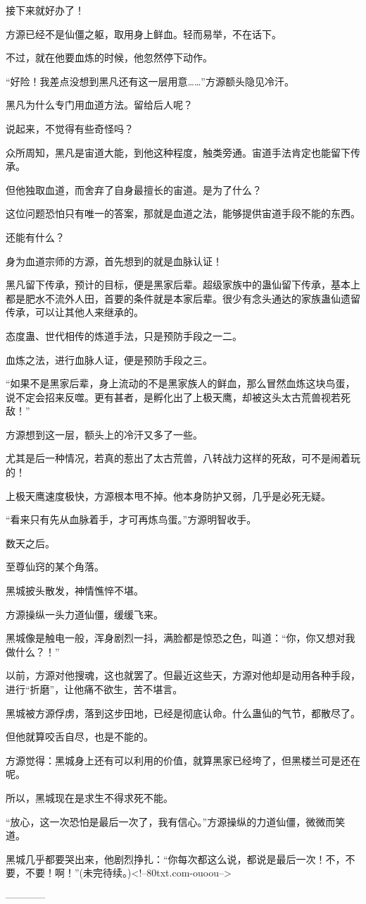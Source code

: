 \begin{this_body}
接下来就好办了！

方源已经不是仙僵之躯，取用身上鲜血。轻而易举，不在话下。

不过，就在他要血炼的时候，他忽然停下动作。

“好险！我差点没想到黑凡还有这一层用意……”方源额头隐见冷汗。

黑凡为什么专门用血道方法。留给后人呢？

说起来，不觉得有些奇怪吗？

众所周知，黑凡是宙道大能，到他这种程度，触类旁通。宙道手法肯定也能留下传承。

但他独取血道，而舍弃了自身最擅长的宙道。是为了什么？

这位问题恐怕只有唯一的答案，那就是血道之法，能够提供宙道手段不能的东西。

还能有什么？

身为血道宗师的方源，首先想到的就是血脉认证！

黑凡留下传承，预计的目标，便是黑家后辈。超级家族中的蛊仙留下传承，基本上都是肥水不流外人田，首要的条件就是本家后辈。很少有念头通达的家族蛊仙遗留传承，可以让其他人来继承的。

态度蛊、世代相传的炼道手法，只是预防手段之一二。

血炼之法，进行血脉人证，便是预防手段之三。

“如果不是黑家后辈，身上流动的不是黑家族人的鲜血，那么冒然血炼这块鸟蛋，说不定会招来反噬。更有甚者，是孵化出了上极天鹰，却被这头太古荒兽视若死敌！”

方源想到这一层，额头上的冷汗又多了一些。

尤其是后一种情况，若真的惹出了太古荒兽，八转战力这样的死敌，可不是闹着玩的！

上极天鹰速度极快，方源根本甩不掉。他本身防护又弱，几乎是必死无疑。

“看来只有先从血脉着手，才可再炼鸟蛋。”方源明智收手。

数天之后。

至尊仙窍的某个角落。

黑城披头散发，神情憔悴不堪。

方源操纵一头力道仙僵，缓缓飞来。

黑城像是触电一般，浑身剧烈一抖，满脸都是惊恐之色，叫道：“你，你又想对我做什么？！”

以前，方源对他搜魂，这也就罢了。但最近这些天，方源对他却是动用各种手段，进行“折磨”，让他痛不欲生，苦不堪言。

黑城被方源俘虏，落到这步田地，已经是彻底认命。什么蛊仙的气节，都散尽了。

但他就算咬舌自尽，也是不能的。

方源觉得：黑城身上还有可以利用的价值，就算黑家已经垮了，但黑楼兰可是还在呢。

所以，黑城现在是求生不得求死不能。

“放心，这一次恐怕是最后一次了，我有信心。”方源操纵的力道仙僵，微微而笑道。

黑城几乎都要哭出来，他剧烈挣扎：“你每次都这么说，都说是最后一次！不，不要，不要！啊！”(未完待续。)<!--80txt.com-ouoou-->

------------

\end{this_body}

